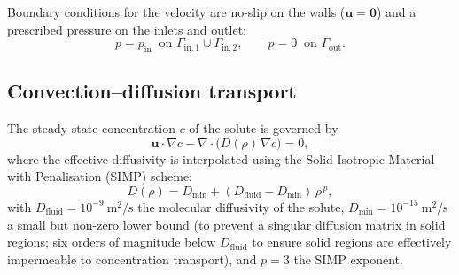Boundary conditions for the velocity are no-slip on the walls (\(\mathbf{u}=\mathbf{0}\)) and a prescribed pressure on the inlets and outlet:
\begin{equation}
    p = p_{\text{in}} \;\; \text{on } \Gamma_{\text{in},1}\cup\Gamma_{\text{in},2}, \qquad p = 0 \;\; \text{on } \Gamma_{\text{out}}.
\end{equation}

\subsection{Convection--diffusion transport}
\label{sec:convdiff}
The steady-state concentration \(c\) of the solute is governed by
\begin{equation}
    \mathbf{u}\cdot\nabla c - \nabla\cdot\bigl(D(\rho)\,\nabla c\bigr) = 0,
    \label{eq:convdiff}
\end{equation}
where the effective diffusivity is interpolated using the
Solid Isotropic Material with Penalisation (SIMP) scheme:
\begin{equation}
    D(\rho) = D_{\min} + (D_{\text{fluid}} - D_{\min})\,\rho^{\,p},
    \label{eq:Dinterp}
\end{equation}
with \(D_{\text{fluid}} = 10^{-9}\ \text{m}^2/\text{s}\) the molecular diffusivity of the solute, \(D_{\min}=10^{-15}\ \text{m}^2/\text{s}\) a small but non-zero lower bound (to prevent a singular diffusion matrix in solid regions; six orders of magnitude below \(D_{\text{fluid}}\) to ensure solid regions are effectively impermeable to concentration transport), and \(p=3\) the SIMP exponent.

